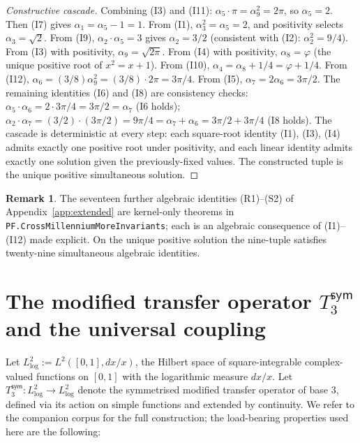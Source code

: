 \documentclass[11pt,a4paper]{amsart}
\theoremstyle{plain}
\theoremstyle{definition}
\newtheorem{remark}[theorem]{Remark}
\begin{document}
\begin{proof}[Constructive cascade]
Combining (I3) and (I11): $\alpha_5\cdot\pi = \alpha_9^2 = 2\pi$, so $\alpha_5 = 2$. Then (I7) gives $\alpha_1 = \alpha_5 - 1 = 1$. From (I1), $\alpha_3^2 = \alpha_5 = 2$, and positivity selects $\alpha_3 = \sqrt{2}$. From (I9), $\alpha_2\cdot\alpha_5 = 3$ gives $\alpha_2 = 3/2$ (consistent with (I2): $\alpha_2^2 = 9/4$). From (I3) with positivity, $\alpha_9 = \sqrt{2\pi}$. From (I4) with positivity, $\alpha_8 = \varphi$ (the unique positive root of $x^2 = x+1$). From (I10), $\alpha_4 = \alpha_8 + 1/4 = \varphi + 1/4$. From (I12), $\alpha_6 = (3/8)\alpha_9^2 = (3/8)\cdot 2\pi = 3\pi/4$. From (I5), $\alpha_7 = 2\alpha_6 = 3\pi/2$. The remaining identities (I6) and (I8) are consistency checks: $\alpha_5\cdot\alpha_6 = 2\cdot 3\pi/4 = 3\pi/2 = \alpha_7$ (I6 holds); $\alpha_2\cdot\alpha_7 = (3/2)\cdot(3\pi/2) = 9\pi/4 = \alpha_7 + \alpha_6 = 3\pi/2 + 3\pi/4$ (I8 holds). The cascade is deterministic at every step: each square-root identity (I1), (I3), (I4) admits exactly one positive root under positivity, and each linear identity admits exactly one solution given the previously-fixed values. The constructed tuple is the unique positive simultaneous solution.
\end{proof}

\begin{remark}
The seventeen further algebraic identities (R1)--(S2) of Appendix~\ref{app:extended} are kernel-only theorems in \texttt{PF.CrossMillenniumMoreInvariants}; each is an algebraic consequence of (I1)--(I12) made explicit. On the unique positive solution the nine-tuple satisfies twenty-nine simultaneous algebraic identities.
\end{remark}

\section{The modified transfer operator $T_3^{\textsf{sym}}$ and the universal coupling}\label{sec:operator}

Let $L^2_{\log} := L^2([0,1], dx/x)$, the Hilbert space of square-integrable complex-valued functions on $[0,1]$ with the logarithmic measure $dx/x$. Let $T_3^{\textsf{sym}}: L^2_{\log} \to L^2_{\log}$ denote the symmetrised modified transfer operator of base $3$, defined via its action on simple functions and extended by continuity. We refer to the companion corpus for the full construction; the load-bearing properties used here are the following:
\end{document}
